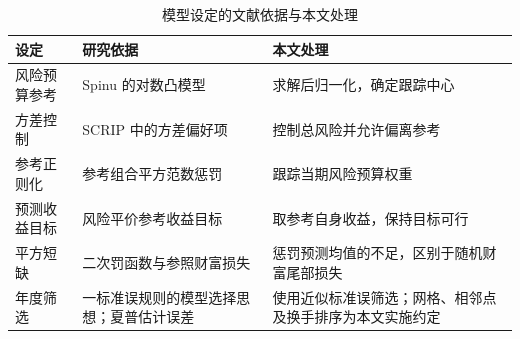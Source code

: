 \begin{table}[htbp]\centering
\caption{模型设定的文献依据与本文处理}\label{tab:literature_model_link}
\begin{tabularx}{\textwidth}{@{}p{2.6cm} L L@{}}
\toprule 设定 & 研究依据 & 本文处理\\\midrule
风险预算参考 & Spinu 的对数凸模型\cite{spinu2013algorithm} & 求解后归一化，确定跟踪中心\\
方差控制 & SCRIP 中的方差偏好项\cite{feng2015scrip} & 控制总风险并允许偏离参考\\
参考正则化 & 参考组合平方范数惩罚\cite{bourgeron2018robust} & 跟踪当期风险预算权重\\
预测收益目标 & 风险平价参考收益目标\cite{gambeta2020risk} & 取参考自身收益，保持目标可行\\
平方短缺 & 二次罚函数与参照财富损失\cite{nocedal2006numerical,siegmann2005discrete} & 惩罚预测均值的不足，区别于随机财富尾部损失\\
年度筛选 & 一标准误规则的模型选择思想\cite{hastie2009elements}；夏普估计误差\cite{lo2002statistics} & 使用近似标准误筛选；网格、相邻点及换手排序为本文实施约定\\
\bottomrule
\end{tabularx}
\end{table}
